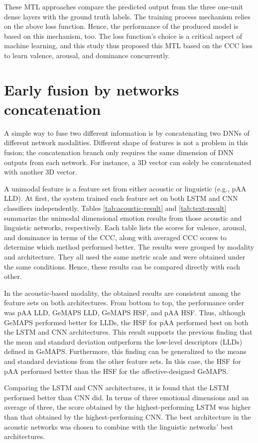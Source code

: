 These MTL approaches compare the predicted output from the three one-unit dense
layers with the ground truth labels. The training process mechanism relies on
the above loss function. Hence, the performance of the produced model is based
on this mechanism, too. The loss function's choice is a critical aspect of
machine learning, and this study thus proposed this MTL based on the CCC loss
to learn valence, arousal, and dominance concurrently.

\section{Early fusion by networks concatenation}
A simple way to fuse two different information is by concatenating two DNNs of
different network modalities. Different shape of features is not a problem in
this fusion; the concatenation branch only requires the same dimension of DNN
outputs from each network. For instance, a 3D vector can solely be concatenated
with another 3D vector.

A unimodal feature is a feature set from either acoustic or linguistic (e.g.,
pAA LLD). At first, the system trained each feature set on both LSTM and CNN
classifiers independently. Tables \ref{tab:acoustic-result} and
\ref{tab:text-result} summarize the unimodal dimensional emotion results from
those acoustic and linguistic networks, respectively. Each table lists the
scores for valence, arousal, and dominance in terms of the CCC, along with
averaged CCC scores to determine which method performed better. The results
were grouped by modality and architecture. They all used the same metric scale
and were obtained under the same conditions. Hence, these results can be
compared directly with each other.

In the acoustic-based modality, the obtained results are consistent among the
feature sets on both architectures. From bottom to top, the performance order
was pAA LLD, GeMAPS LLD, GeMAPS HSF, and pAA HSF. Thus, although GeMAPS
performed better for LLDs, the HSF for pAA performed best on both the LSTM and
CNN architectures.  This result supports the previous finding that the mean and
standard deviation outperform the low-level descriptors (LLDs) defined in
GeMAPS. Furthermore, this finding can be generalized to the means and standard
deviations from the other feature sets. In this case, the HSF for pAA performed
better than the HSF for the affective-designed GeMAPS. 

Comparing the LSTM and CNN architectures, it is found that the LSTM performed
better than CNN did. In terms of three emotional dimensions and an average of
three, the score obtained by the highest-performing LSTM was higher than that
obtained by the highest-performing CNN. The best architecture in the acoustic
networks was chosen to combine with the linguistic networks' best
architectures.

